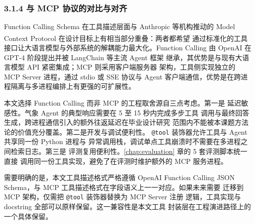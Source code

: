 \documentclass[a4paper]{article}
\theoremstyle{definition}
\theoremstyle{plain}
\theoremstyle{remark}
\newcommand{\reffig}[1]{图 \ref{#1}}
\newcommand{\reftab}[1]{表 \ref{#1}}
\let\oldcite\cite
\renewcommand{\cite}[1]{\textsuperscript{\oldcite{#1}}}
\begin{document}
\subsubsection*{3.1.4 \quad 与 MCP 协议的对比与对齐}

Function Calling Schema 在工具描述层面与 Anthropic 等机构推动的 Model
Context Protocol \cite{ref11} 在设计目标上有相当部分重叠：两者都希望
通过标准化的工具接口让大语言模型与外部系统的解耦能力最大化。Function
Calling 由 OpenAI 在 GPT-4 阶段提出并被 LangChain 等主流 Agent 框架
继承，其优势是与现有大语言模型 API 紧密集成；MCP 则采用客户端服务器
架构，工具侧实现独立的 MCP Server 进程，通过 stdio 或 SSE 协议与
Agent 客户端通信，优势是在跨进程隔离与多进程编排上有更强的可扩展性。

本文选择 Function Calling 而非 MCP 的工程取舍源自三点考虑。第一是
延迟敏感性。气象 Agent 的典型响应需要在 5 至 15 秒内完成多步工具
调用与最终回答生成，跨进程通信引入的额外往返延迟在毕业设计研究
范围内不能被本课题方法论的价值充分覆盖。第二是开发与调试便利性。
\texttt{@tool} 装饰器允许工具与 Agent 共享同一份 Python 进程与
异常调用栈，调试单点工具崩溃时不需要在多进程之间检索日志。第三是
评测复用便利性。\ref{chap:evaluation} 章的 5 套评测脚本统一直接
调用同一份工具实现，避免了在评测时维护额外的 MCP 服务进程。

需要明确的是，本文工具描述格式严格遵循 OpenAI Function Calling
JSON Schema，与 MCP 工具描述格式在字段语义上一一对应。如果未来需要
迁移到 MCP 架构，仅需把 \texttt{@tool} 装饰器替换为 MCP Server 注册
逻辑，工具实现与 docstring 全部可以原样保留。这一兼容性是本文工具
封装层在工程演进路径上的一个具体保留。



﻿%
\end{document}

